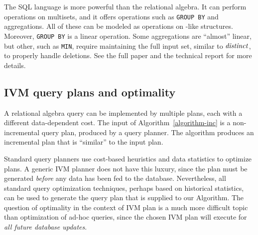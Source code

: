 The SQL language is more powerful than the relational algebra.  It can
perform operations on multisets, and it offers operations such as
\texttt{GROUP BY} and aggregations.  All of these can be modeled as
operations on \zr-like structures.  Moreover, \texttt{GROUP BY} is a
linear operation.  Some aggregations are ``almost'' linear, but other,
such as \texttt{MIN}, require maintaining the full input set, similar
to $\mathit{distinct}$, to properly handle deletions.  See the full paper and
the technical report for more details.

\subsection{IVM query plans and optimality}

A relational algebra query can be implemented by multiple plans, each
with a different data-dependent cost.  The input of
Algorithm~\ref{algorithm-inc} is a non-incremental query plan,
produced by a query planner.  The algorithm produces an incremental
plan that is ``similar'' to the input plan.

Standard query planners use cost-based heuristics and data statistics
to optimize plans.  A generic IVM planner does not have this luxury,
since the plan must be generated \emph{before} any data has been fed
to the database.  Nevertheless, all standard query optimization
techniques, perhaps based on historical statistics, can be used to
generate the query plan that is supplied to our Algorithm.  The
question of optimality in the context of IVM plan is a much more
difficult topic than optimization of ad-hoc queries, since the chosen
IVM plan will execute for \emph{all future database updates}.

